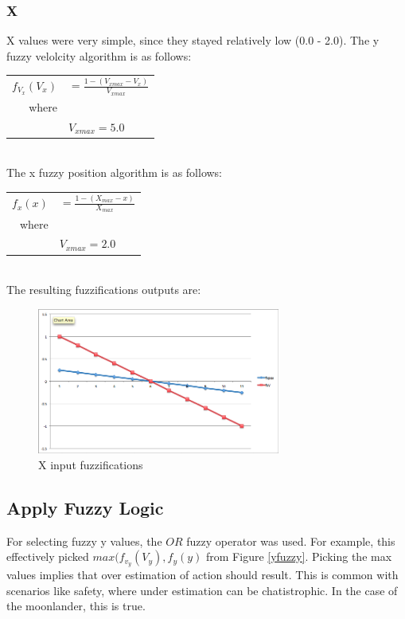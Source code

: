 \documentclass[12pt]{article}
\begin{document}
\subsubsection{X}
X values were very simple, since they stayed relatively low (0.0 - 2.0).  The y fuzzy velolcity algorithm is as
follows: \\

\begin{tabular}{r l}
	$f_{V_x}(V_x)$	&	$ = \frac{1 - (V_{x max} - V_x)}{V_{x max}} $\\
	where		&	\\
				&	$V_{x max} = 5.0$\\			
\end{tabular} \\

The x fuzzy position algorithm is as
follows: \\

\begin{tabular}{r l}
	$f_{x}(x)$		&	$ = \frac{1 - (X_{max} - x)}{X_{max}} $\\				
	where		&	\\
				&	$V_{x max} = 2.0$\\	
\end{tabular} \\

The resulting fuzzifications outputs are:

\begin{figure}[h!]
        \begin{center}
                \includegraphics[width=80mm]{report_images/xfuzzy.png}
                \caption{X input fuzzifications}
                \label{xfuzzy}
        \end{center}
\end{figure}

\subsection{Apply Fuzzy Logic}
For selecting fuzzy y values, the $OR$ fuzzy operator was used. For example, this effectively picked 
$max(f_{v_y}(V_y),f_{y}(y)$ from Figure \ref{yfuzzy}. Picking the max values implies that over estimation of
action should result. This is common with scenarios like safety, where under estimation can be chatistrophic.
In the case of the moonlander, this is true.
\end{document}
